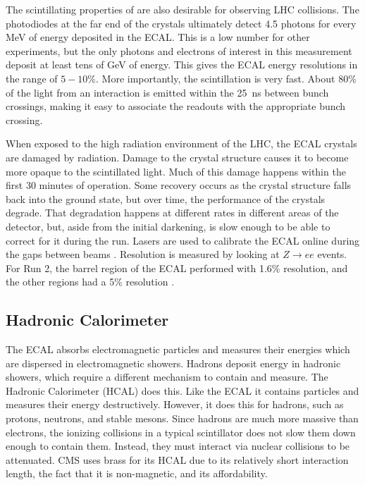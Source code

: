 The scintillating properties of  are also desirable for observing LHC collisions.
The photodiodes at the far end of the crystals
ultimately detect 4.5 photons for every MeV of energy deposited in the ECAL.
This is a low number for other experiments, but the only photons and electrons of
interest in this measurement deposit at least tens of GeV of energy.
This gives the ECAL energy resolutions in the range of $5-10\%$.
More importantly, the scintillation is very fast.
About 80\% of the light from an interaction is emitted within
the \SI{25}{ns} between bunch crossings,
making it easy to associate the readouts with the appropriate bunch crossing.

When exposed to the high radiation environment of the LHC,
the ECAL crystals are damaged by radiation.
Damage to the crystal structure causes it to become more opaque to the scintillated light.
Much of this damage happens within the first 30 minutes of operation.
Some recovery occurs as the crystal structure falls back into the ground state,
but over time, the performance of the crystals degrade.
That degradation happens at different rates in different areas of the detector,
but, aside from the initial darkening,
is slow enough to be able to correct for it during the run.
Lasers are used to calibrate the ECAL online during
the gaps between beams \cite{Monti:2653861}.
Resolution is measured by looking at $Z\rightarrow ee$ events.
For Run 2, the barrel region of the ECAL performed with 1.6\% resolution,
and the other regions had a 5\% resolution \cite{Bartosik:2712238}.

\subsection{Hadronic Calorimeter}

The ECAL absorbs electromagnetic particles and measures their energies
which are dispersed in electromagnetic showers.
Hadrons deposit energy in hadronic showers,
which require a different mechanism to contain and measure.
The Hadronic Calorimeter (HCAL) does this.
Like the ECAL it contains particles and measures their energy destructively.
However, it does this for hadrons, such as protons, neutrons, and stable mesons.
Since hadrons are much more massive than electrons,
the ionizing collisions in a typical scintillator does not slow them down
enough to contain them.
Instead, they must interact via nuclear collisions to be attenuated.
CMS uses brass for its HCAL due to its relatively short interaction length,
the fact that it is non-magnetic, and its affordability.

